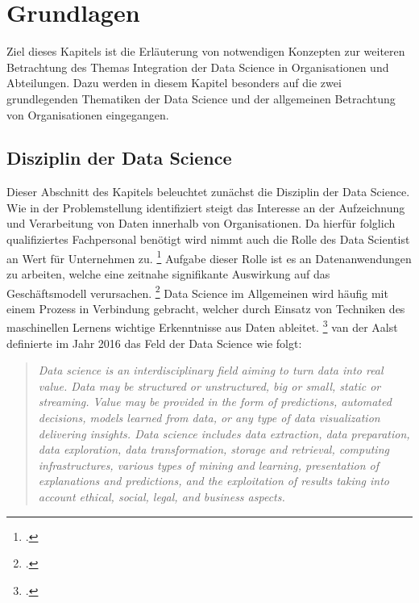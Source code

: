 \chapter[Grundlagen]{Grundlagen}

Ziel dieses Kapitels ist die Erläuterung von notwendigen Konzepten zur weiteren Betrachtung des Themas Integration der Data Science in Organisationen und Abteilungen.
Dazu werden in diesem Kapitel besonders auf die zwei grundlegenden Thematiken der Data Science und der allgemeinen Betrachtung von Organisationen eingegangen.

\section{Disziplin der Data Science}

Dieser Abschnitt des Kapitels beleuchtet zunächst die Disziplin der Data Science.
Wie in der Problemstellung identifiziert steigt das Interesse an der Aufzeichnung und Verarbeitung von Daten innerhalb von Organisationen. 
Da hierfür folglich qualifiziertes Fachpersonal benötigt wird nimmt auch die Rolle des Data Scientist an Wert für Unternehmen zu. \footcite[prenote][postnote]{the role of data scientists}
Aufgabe dieser Rolle ist es an Datenanwendungen zu arbeiten, welche eine zeitnahe signifikante Auswirkung auf das Geschäftsmodell verursachen. \footcite[prenote][postnote]{aim of data scientists}
Data Science im Allgemeinen wird häufig mit einem Prozess in Verbindung gebracht, welcher durch Einsatz von Techniken des maschinellen Lernens wichtige Erkenntnisse aus Daten ableitet. \footcite[prenote][postnote]{data science often refers}
van der Aalst definierte im Jahr 2016 das Feld der Data Science wie folgt: \cite[prenote][postnote]{data science definition}

\begin{quotation}
    \textit{
    Data science is an interdisciplinary ﬁeld aiming to turn data into real value.
    Data may be structured or unstructured, big or small, static or streaming.
    Value may be provided in the form of predictions, automated decisions, models learned from data, or any type of data visualization delivering insights.
    Data science includes data extraction, data preparation, data exploration, data transformation, storage and retrieval, computing infrastructures, various types of mining and learning, presentation of explanations and predictions, and the exploitation of results taking into account ethical, social, legal, and business aspects.    
    }
\end{quotation}

